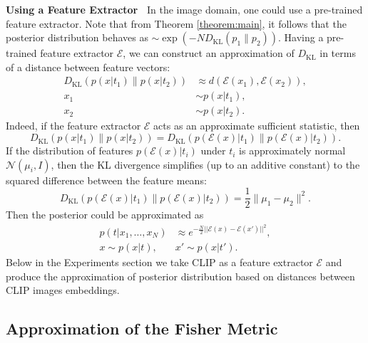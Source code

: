 \documentclass{article}
\theoremstyle{plain}
\theoremstyle{definition}
\theoremstyle{remark}
\begin{document}
\textbf{Using a Feature Extractor~} In the image domain, one could use a pre-trained feature extractor. Note that from Theorem \ref{theorem:main}, it follows that the posterior distribution behaves as $\sim \exp(-N D_{\text{KL}}(p_1 \parallel p_2))$. Having a pre-trained feature extractor $\mathcal{E}$, we can construct an approximation of $D_{\text{KL}}$ in terms of a distance between feature vectors:
\begin{equation}
\begin{split}
    D_{\text{KL}}(p(x|t_{1}) \parallel p(x|t_{2})) &\approx d(\mathcal{E}(x_{1}), \mathcal{E}(x_{2})), \\
    x_{1} &\sim p(x|t_{1}), \\
    x_{2} &\sim p(x|t_{2}).
\end{split}     
\end{equation}
Indeed, if the feature extractor $\mathcal{E}$ acts as an approximate sufficient statistic, then
\begin{equation}
    D_{\text{KL}}(p(x|t_{1}) \parallel p(x|t_{2})) = D_{\text{KL}}(p(\mathcal{E}(x)|t_{1}) \parallel p(\mathcal{E}(x)|t_{2})).
\end{equation}
If the distribution of features $p(\mathcal{E}(x)|t_{i})$ under $t_i$ is approximately normal $\mathcal{N}(\mu_i, I)$, then the KL divergence simplifies (up to an additive constant) to the squared difference between the feature means:
\begin{equation}
    D_{\text{KL}}(p(\mathcal{E}(x)|t_{1}) \parallel p(\mathcal{E}(x)|t_{2})) = \frac{1}{2} \|\mu_{1} - \mu_{2}\|^{2}.
\end{equation}
Then the posterior could be approximated as
\begin{equation}
\begin{split}
    p(t|x_{1}, \dots, x_{N}) &\approx e^{- \frac{N}{2}||\mathcal{E}(x)- \mathcal{E}(x')||^{2}}, \\
    x \sim p(x|t),\ & x' \sim p(x|t').
\end{split}     
\end{equation}
Below in the Experiments section we take CLIP as a feature extractor $\mathcal{E}$ and produce the approximation of posterior distribution based on distances between CLIP images embeddings.


\subsection{Approximation of the Fisher Metric}
\end{document}
